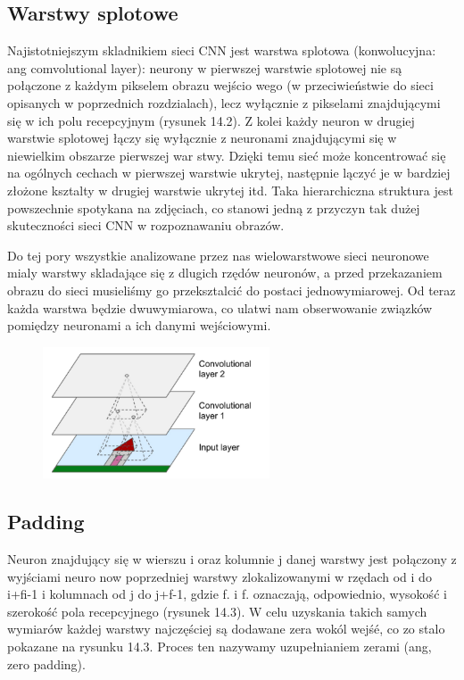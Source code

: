 \documentclass{article}
\begin{document}
\subsection{Warstwy splotowe}
Najistotniejszym skladnikiem sieci CNN jest warstwa splotowa (konwolucyjna: ang comvolutional layer): neurony w pierwszej warstwie splotowej nie są połączone z każdym pikselem obrazu wejścio wego (w przeciwieństwie do sieci opisanych w poprzednich rozdzialach), lecz wyłącznie z pikselami znajdującymi się w ich polu recepcyjnym (rysunek 14.2). Z kolei każdy neuron w drugiej warstwie splotowej łączy się wyłącznie z neuronami znajdującymi się w niewielkim obszarze pierwszej war stwy. Dzięki temu sieć może koncentrować się na ogólnych cechach w pierwszej warstwie ukrytej, następnie lączyć je w bardziej złożone ksztalty w drugiej warstwie ukrytej itd. Taka hierarchiczna struktura jest powszechnie spotykana na zdjęciach, co stanowi jedną z przyczyn tak dużej skuteczności sieci CNN w rozpoznawaniu obrazów. \cite{geron}

Do tej pory wszystkie analizowane przez nas wielowarstwowe sieci neuronowe mialy warstwy skladające się z dlugich rzędów neuronów, a przed przekazaniem obrazu do sieci musieliśmy go przeksztalcić do postaci jednowymiarowej. Od teraz każda warstwa będzie dwuwymiarowa, co ulatwi nam obserwowanie związków pomiędzy neuronami a ich danymi wejściowymi. \cite{geron}
\begin{figure}[H]
	\centering
	\includegraphics[width=0.6\textwidth,keepaspectratio=true]{warstwa_splotowa}
	\caption{}
\end{figure}

\subsection{Padding}
Neuron znajdujący się w wierszu i oraz kolumnie j danej warstwy jest połączony z wyjściami neuro now poprzedniej warstwy zlokalizowanymi w rzędach od i do i+fi-1 i kolumnach od j do j+f-1, gdzie f. i f. oznaczają, odpowiednio, wysokość i szerokość pola recepcyjnego (rysunek 14.3). W celu uzyskania takich samych wymiarów każdej warstwy najczęściej są dodawane zera wokól wejśé, co zo stalo pokazane na rysunku 14.3. Proces ten nazywamy uzupełnianiem zerami (ang, zero padding). \cite{geron}
\end{document}
